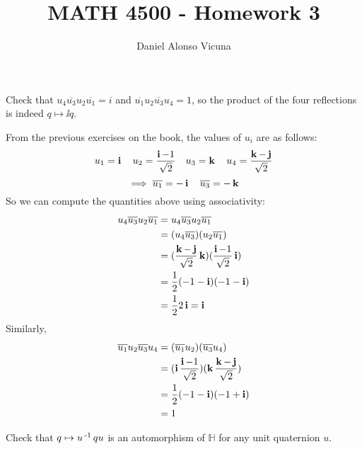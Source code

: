 \documentclass[11pt,onecolumn]{article}
\title{MATH 4500 - Homework 3}
\author{Daniel Alonso Vicuna}
\begin{document}
\maketitle

\begin{exercise}
 Check that $u_4\overline{u_3}u_2\overline{u_1} = i$ and $\overline{u_1}u_2\overline{u_3}u_4 = 1$, so the product of the four reﬂections is indeed $q\mapsto \ii q$.
\end{exercise}
\begin{answer}
From the previous exercises on the book, the values of $u_i$ are as follows:
$$ u_1 = \operatorname{\textbf{i}} \quad u_2 = \frac{\operatorname{\textbf{i}}-1}{\sqrt{2}} \quad u_3 = \operatorname{\textbf{k}} \quad u_4 = \frac{\operatorname{\textbf{k}} - \operatorname{\textbf{j}}}{\sqrt{2}}$$ 
$$ \implies \overline{u_1} = -\operatorname{\textbf{i}} \quad \overline{u_3} = -\operatorname{\textbf{k}} $$
So we can compute the quantities above using associativity:
\begin{align*}
    u_4\overline{u_3}u_2\overline{u_1} &= u_4\overline{u_3}u_2\overline{u_1}\\
    &= (u_4\overline{u_3})(u_2\overline{u_1}) \\
    &= (\frac{\operatorname{\textbf{k}} - \operatorname{\textbf{j}}}{\sqrt{2}} \operatorname{\textbf{k}})(\frac{\operatorname{\textbf{i}}-1}{\sqrt{2}} \operatorname{\textbf{i}})\\
    &= \frac{1}{2} (-1-\operatorname{\textbf{i}})(-1-\operatorname{\textbf{i}}) \\
    &= \frac{1}{2}2\operatorname{\textbf{i}} = \operatorname{\textbf{i}}
\end{align*}
Similarly,
\begin{align*}
    \overline{u_1}u_2\overline{u_3}u_4 &= (\overline{u_1}u_2)(\overline{u_3}u_4) \\
    &= (\operatorname{\textbf{i}} \frac{\operatorname{\textbf{i}}-1}{\sqrt{2}} )(\operatorname{\textbf{k}} \frac{\operatorname{\textbf{k}} - \operatorname{\textbf{j}}}{\sqrt{2}} ) \\
    &=\frac{1}{2} (-1-\operatorname{\textbf{i}})(-1+\operatorname{\textbf{i}}) \\
    &= 1
\end{align*}
\end{answer}
\begin{exercise}
Check that $q\mapsto u\operatorname{^{-1}} qu$ is an automorphism of $\mathbb{H}$ for any unit quaternion $u$. 
\end{exercise}
\end{document}
